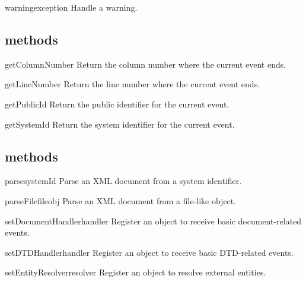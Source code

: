 \documentclass{howto}
\begin{document}
\begin{methoddesc}{warning}{exception}
Handle a warning.
\end{methoddesc}

\subsection{ methods}

\begin{methoddesc}{getColumnNumber}{}
Return the column number where the current event ends.
\end{methoddesc}

\begin{methoddesc}{getLineNumber}{}
Return the line number where the current event ends.
\end{methoddesc}

\begin{methoddesc}{getPublicId}{}
Return the public identifier for the current event.
\end{methoddesc}

\begin{methoddesc}{getSystemId}{}
Return the system identifier for the current event.
\end{methoddesc}

\subsection{ methods}

\begin{methoddesc}{parse}{systemId}
Parse an XML document from a system identifier.
\end{methoddesc}

\begin{methoddesc}{parseFile}{fileobj}
Parse an XML document from a file-like object.
\end{methoddesc}

\begin{methoddesc}{setDocumentHandler}{handler}
Register an object to receive basic document-related events.
\end{methoddesc}

\begin{methoddesc}{setDTDHandler}{handler}
Register an object to receive basic DTD-related events.
\end{methoddesc}

\begin{methoddesc}{setEntityResolver}{resolver}
Register an object to resolve external entities.
\end{methoddesc}
\end{document}
